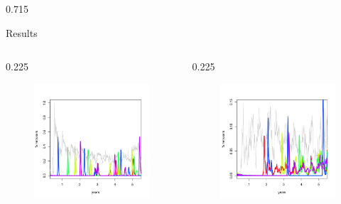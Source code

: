 \documentclass[final]{beamer} %
\newcommand{\spaceProp}{0.02}
\newcommand{\spacer}{\begin{column}{\spaceProp\paperwidth}\end{column}}
\newenvironment{oneCol}{\begin{column}[t]{0.225\paperwidth}}{\end{column}}
\newenvironment{threeCol}{\begin{column}[t]{0.715\paperwidth}}{\end{column}}
\begin{document}
\begin{frame}{}
\begin{columns}[t]
\begin{threeCol}
\begin{block}{Results}
\begin{columns}
\begin{oneCol}
\begin{figure}
      \end{figure}
      \begin{figure}
        \includegraphics[width=1.0\linewidth]{out180.png}
      \end{figure}  
    \end{oneCol}
    \begin{oneCol}
      \begin{figure}
        \includegraphics[width=1.0\linewidth]{out30.png}

\end{figure}
\end{oneCol}
\end{columns}
\end{block}
\end{threeCol}
\end{columns}
\end{frame}
\end{document}
